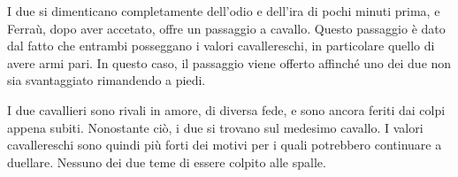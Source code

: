 \documentclass[a4paper]{article}
\begin{document}
\begin{center} %
\begin{minipage}{0.5\textwidth}
\centering
{}
\end{minipage}
\end{center}

I due si dimenticano completamente dell'odio e dell'ira di pochi
minuti prima, e Ferraù, dopo aver accetato, offre un passaggio a cavallo.
Questo passaggio è dato dal fatto che entrambi posseggano i valori cavallereschi,
in particolare quello di avere armi pari. In questo caso,
il passaggio viene offerto affinché uno dei due non sia svantaggiato
rimandendo a piedi.

\begin{center} %
\begin{minipage}{0.5\textwidth}
\centering
{}
\end{minipage}
\end{center}

I due cavallieri sono rivali in amore, di diversa fede, e sono ancora
feriti dai colpi appena subiti. Nonostante ciò, i due si trovano sul medesimo cavallo.
I valori cavallereschi sono quindi più forti dei motivi per i quali
potrebbero continuare a duellare. Nessuno dei due teme di essere colpito alle spalle.
\end{document}
